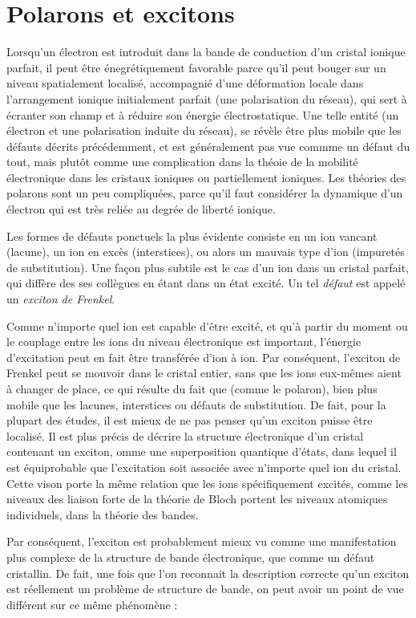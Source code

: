 \section{Polarons et excitons}

Lorsqu'un électron est introduit dans la bande de conduction d'un cristal ionique parfait, il peut être énegrétiquement favorable parce qu'il peut bouger sur un niveau spatialement localisé, accompagnié d'une déformation locale dans l'arrangement ionique initialement parfait (\ie une polarisation du réseau), qui sert à écranter son champ et à réduire son énergie électrostatique. Une telle entité (un électron et une polarisation induite du réseau), se révèle être plus mobile que les défauts décrits précédemment, et est généralement pas vue commme un défaut du tout, mais plutôt comme une complication dans la théoie de la mobilité électronique dans les cristaux ioniques ou partiellement ioniques. Les théories des polarons sont un peu compliquées, parce qu'il faut considérer la dynamique d'un électron qui est très reliée au degrée de liberté ionique.

Les formes de défauts ponctuels la plus évidente consiste en un ion vancant (lacune), un ion en excès (interstices), ou alors un mauvais type d'ion (impuretés de substitution). Une façon plus subtile est le cas d'un ion dans un cristal parfait, qui diffère des ses collègues en étant dans un état excité. Un tel \emph{défaut} est appelé un \emph{exciton de Frenkel}.

Comme n'importe quel ion est capable d'être excité, et qu'à partir du moment ou le couplage entre les ions du niveau électronique est important, l'énergie d'excitation peut en fait être transférée d'ion à ion. Par conséquent, l'exciton de Frenkel peut se mouvoir dans le cristal entier, sans que les ions eux-mêmes aient à changer de place, ce qui résulte du fait que (comme le polaron), bien plus mobile que les lacunes, interstices ou défauts de substitution. De fait, pour la plupart des études, il est mieux de ne pas penser qu'un exciton puisse être localisé. Il est plus précis de décrire la structure électronique d'un cristal contenant un exciton, omme une superposition quantique d'états, dans lequel il est équiprobable que l'excitation soit associée avec n'importe quel ion du cristal. Cette vison porte la même relation que les ions spécifiquement excités, comme les niveaux des liaison forte de la théorie de Bloch portent les niveaux atomiques individuels, dans la théorie des bandes.

Par conséquent, l'exciton est probablement mieux vu comme une manifestation plus complexe de la structure de bande électronique, que comme un défaut cristallin. De fait, une fois que l'on reconnait la description correcte qu'un exciton est réellement un problème de structure de bande, on peut avoir un point de vue différent sur ce même phénomène :


